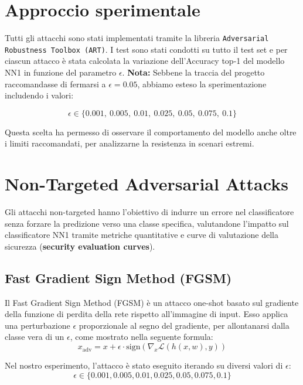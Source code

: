     \section{Approccio sperimentale}
        Tutti gli attacchi sono stati implementati tramite la libreria \texttt{Adversarial Robustness Toolbox (ART)}. I test sono stati condotti su tutto il test set e per ciascun attacco è stata calcolata la variazione dell’Accuracy top-1 del modello NN1 in funzione del parametro $\epsilon$.
        \textbf{Nota:} Sebbene la traccia del progetto raccomandasse di fermarsi a $\epsilon = 0.05$, abbiamo esteso la sperimentazione includendo i valori:
        
        \[
        \epsilon \in \{0.001,\ 0.005,\ 0.01,\ 0.025,\ 0.05,\ 0.075,\ 0.1\}
        \]
        
        \noindent Questa scelta ha permesso di osservare il comportamento del modello anche oltre i limiti raccomandati, per analizzarne la resistenza in scenari estremi.

    \section{Non-Targeted Adversarial Attacks}
        Gli attacchi non-targeted hanno l'obiettivo di indurre un errore nel classificatore senza forzare la predizione verso una classe specifica, valutandone l'impatto sul classificatore NN1 tramite metriche quantitative e curve di valutazione della sicurezza (\textbf{security evaluation curves}).

        \subsection{Fast Gradient Sign Method (FGSM)}
            Il Fast Gradient Sign Method (FGSM) è un attacco one-shot basato sul gradiente  della funzione di perdita della rete rispetto all'immagine di input. Esso applica una  perturbazione $\epsilon$ proporzionale al segno del gradiente, per allontanarsi dalla classe vera di un $\epsilon$, come mostrato nella seguente formula:
                $$
                x_{\text{adv}} = x + \epsilon \cdot \text{sign}(\nabla_x \mathcal{L}(h(x, w), y))
                $$

            \noindent Nel nostro esperimento, l'attacco è stato eseguito iterando su diversi valori di $\epsilon$:
                $$
                \epsilon \in \{0.001, 0.005, 0.01, 0.025, 0.05, 0.075, 0.1\}
                $$

